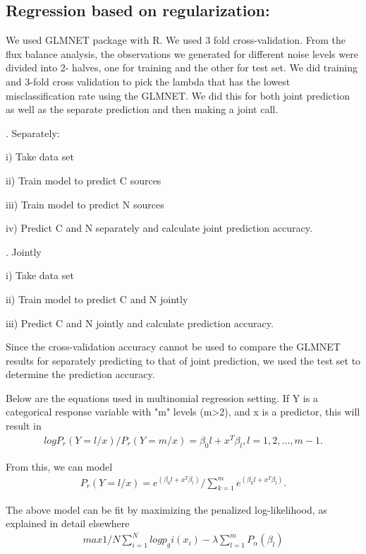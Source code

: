 \documentclass[12pt]{article}
\begin{document}
\subsection*{Regression based on regularization:} 
We used GLMNET package with R. We used 3 fold cross-validation. From the flux balance analysis, the observations we generated for different noise levels were divided into 2- halves, one for training and the other for test set. We did training and 3-fold cross validation to pick the lambda that has the lowest misclassification rate using the GLMNET. We did this for both joint prediction as well as the separate prediction and then making a joint call.

\bigskip
{}. Separately:
\noindent

i) Take data set
\noindent

ii) Train model to predict C sources
\noindent

iii) Train model to predict N sources
\noindent

iv) Predict C and N separately and calculate joint prediction accuracy.

\bigskip
{}. Jointly
\noindent

i) Take data set
\noindent

ii) Train model to predict C and N jointly
\noindent

iii) Predict C and N jointly and calculate prediction accuracy.

\bigskip
\noindent
Since the cross-validation accuracy cannot be used to compare the GLMNET results for separately predicting to that of joint prediction, we used the test set to determine the prediction accuracy.

\bigskip
\noindent
Below are the equations used in multinomial regression setting. If Y is a categorical response variable with "m" levels (m>2), and x is a predictor, this will result in
\begin{align}
log P_r(Y=l/x)/P_r(Y=m/x) = \beta_0l+x^T\beta_l, l=1,2,...,m-1.
\end{align}

From this, we can model
\begin{align}
P_r(Y=l/x) = e^( \beta_0l+x^T\beta_l)/\sum\limits_{k=1}^m e^( \beta_0l+x^T\beta_l).
\end{align}

The above model can be fit by maximizing the penalized log-likelihood, as explained in detail elsewhere \cite{Friedmanetal2008}
\begin{align}
{max} 1/N \sum\limits_{i=1}^N log p_gi(x_i) - \lambda\sum\limits_{l=1}^m P_\alpha(\beta_l)
\end{align}
\end{document}
